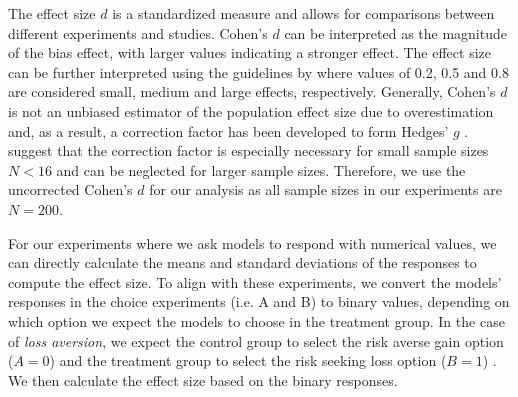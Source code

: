 \par The effect size $d$ is a standardized measure and allows for comparisons between different experiments and studies. Cohen's $d$ can be interpreted as the magnitude of the bias effect, with larger values indicating a stronger effect. The effect size can be further interpreted using the guidelines by \textcite{cohen1988statistical} where values of 0.2, 0.5 and 0.8 are considered small, medium and large effects, respectively. Generally, Cohen's $d$ is not an unbiased estimator of the population effect size due to overestimation and, as a result, a correction factor has been developed to form Hedges' $g$ \parencite{hedges1981distribution}. \textcite{goulet2018review} suggest that the correction factor is especially necessary for small sample sizes $N < 16$ and can be neglected for larger sample sizes. Therefore, we use the uncorrected Cohen's $d$ for our analysis as all sample sizes in our experiments are $N = 200$.

\par For our experiments where we ask models to respond with numerical values, we can directly calculate the means and standard deviations of the responses to compute the effect size. To align with these experiments, we convert the models' responses in the choice experiments (i.e. A and B) to binary values, depending on which option we expect the models to choose in the treatment group. In the case of \textit{loss aversion}, we expect the control group to select the risk averse gain option ($A=0$) and the treatment group to select the risk seeking loss option ($B=1$) \parencite{thaler2015misbehaving}. We then calculate the effect size based on the binary responses.

